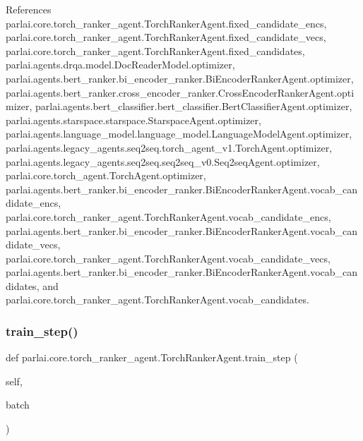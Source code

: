References parlai.\+core.\+torch\+\_\+ranker\+\_\+agent.\+Torch\+Ranker\+Agent.\+fixed\+\_\+candidate\+\_\+encs, parlai.\+core.\+torch\+\_\+ranker\+\_\+agent.\+Torch\+Ranker\+Agent.\+fixed\+\_\+candidate\+\_\+vecs, parlai.\+core.\+torch\+\_\+ranker\+\_\+agent.\+Torch\+Ranker\+Agent.\+fixed\+\_\+candidates, parlai.\+agents.\+drqa.\+model.\+Doc\+Reader\+Model.\+optimizer, parlai.\+agents.\+bert\+\_\+ranker.\+bi\+\_\+encoder\+\_\+ranker.\+Bi\+Encoder\+Ranker\+Agent.\+optimizer, parlai.\+agents.\+bert\+\_\+ranker.\+cross\+\_\+encoder\+\_\+ranker.\+Cross\+Encoder\+Ranker\+Agent.\+optimizer, parlai.\+agents.\+bert\+\_\+classifier.\+bert\+\_\+classifier.\+Bert\+Classifier\+Agent.\+optimizer, parlai.\+agents.\+starspace.\+starspace.\+Starspace\+Agent.\+optimizer, parlai.\+agents.\+language\+\_\+model.\+language\+\_\+model.\+Language\+Model\+Agent.\+optimizer, parlai.\+agents.\+legacy\+\_\+agents.\+seq2seq.\+torch\+\_\+agent\+\_\+v1.\+Torch\+Agent.\+optimizer, parlai.\+agents.\+legacy\+\_\+agents.\+seq2seq.\+seq2seq\+\_\+v0.\+Seq2seq\+Agent.\+optimizer, parlai.\+core.\+torch\+\_\+agent.\+Torch\+Agent.\+optimizer, parlai.\+agents.\+bert\+\_\+ranker.\+bi\+\_\+encoder\+\_\+ranker.\+Bi\+Encoder\+Ranker\+Agent.\+vocab\+\_\+candidate\+\_\+encs, parlai.\+core.\+torch\+\_\+ranker\+\_\+agent.\+Torch\+Ranker\+Agent.\+vocab\+\_\+candidate\+\_\+encs, parlai.\+agents.\+bert\+\_\+ranker.\+bi\+\_\+encoder\+\_\+ranker.\+Bi\+Encoder\+Ranker\+Agent.\+vocab\+\_\+candidate\+\_\+vecs, parlai.\+core.\+torch\+\_\+ranker\+\_\+agent.\+Torch\+Ranker\+Agent.\+vocab\+\_\+candidate\+\_\+vecs, parlai.\+agents.\+bert\+\_\+ranker.\+bi\+\_\+encoder\+\_\+ranker.\+Bi\+Encoder\+Ranker\+Agent.\+vocab\+\_\+candidates, and parlai.\+core.\+torch\+\_\+ranker\+\_\+agent.\+Torch\+Ranker\+Agent.\+vocab\+\_\+candidates.

\mbox{\label{classparlai_1_1core_1_1torch__ranker__agent_1_1TorchRankerAgent_a05ddf921f386f21116ec0ef50796987a}} 
\subsubsection{\texorpdfstring{train\+\_\+step()}{train\_step()}}
{\footnotesize\ttfamily def parlai.\+core.\+torch\+\_\+ranker\+\_\+agent.\+Torch\+Ranker\+Agent.\+train\+\_\+step (\begin{DoxyParamCaption}\item[{}]{self,  }\item[{}]{batch }\end{DoxyParamCaption})}

